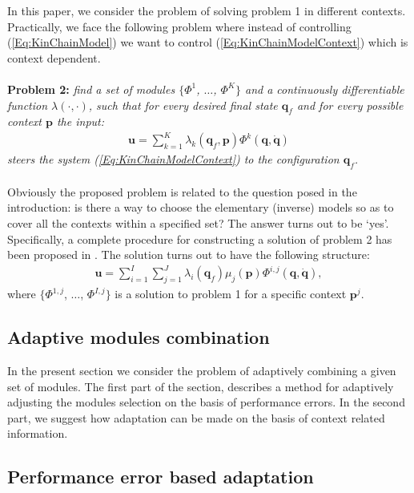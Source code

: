 \documentclass{svmult}
\begin{document}
In this paper, we consider the problem of solving problem 1 in
different contexts. Practically, we face the following problem where
instead of controlling (\ref{Eq:KinChainModel}) we want to control
(\ref{Eq:KinChainModelContext}) which is context dependent.
\\
\\
\textbf{Problem 2:} {\em find a set of modules $\{\Phi^1$, $\dots$,
$\Phi^K\}$ and a continuously differentiable function
$\lambda(\cdot, \cdot)$, such that for every desired final state
$\mathbf q_f$ and for every possible context $\mathbf p$ the input:
\begin{eqnarray}
\mathbf u = \sum_{k=1}^K \lambda_k(\mathbf q_f, \mathbf p)
\Phi^k(\mathbf q, \dot{\mathbf q})
\end{eqnarray}
steers the system (\ref{Eq:KinChainModelContext}) to the configuration $\mathbf q_f$.}\\
\\
Obviously the proposed problem is related to the question posed in
the introduction: is there a way to choose the elementary (inverse)
models so as to cover all the contexts within a specified set? The
answer turns out to be `yes'. Specifically, a complete procedure for
constructing a solution of problem 2 has been proposed in
\cite{NoriPhDThesis}. The solution turns out to have the following
structure:
\begin{eqnarray} \label{Eq:BasicModelControlContext}
\mathbf u = \sum_{i = 1}^I \sum_{j = 1}^J \lambda_i(\mathbf q_f)
\mu_j(\mathbf p) \Phi^{i,j}(\mathbf q, \dot{\mathbf q}),
\end{eqnarray}
where $\{\Phi^{1,j}$, $\dots$, $\Phi^{I,j}\}$ is a solution to
problem 1 for a specific context $\mathbf p^j$.

\subsection{Adaptive modules combination}

In the present section we consider the problem of adaptively
combining a given set of modules. The first part of the section,
describes a method for adaptively adjusting the modules selection on
the basis of performance errors. In the second part, we suggest how
adaptation can be made on the basis of context related information.

\subsection{Performance error based adaptation}
\label{Sec:ErrorBasedAdapt}
\end{document}
